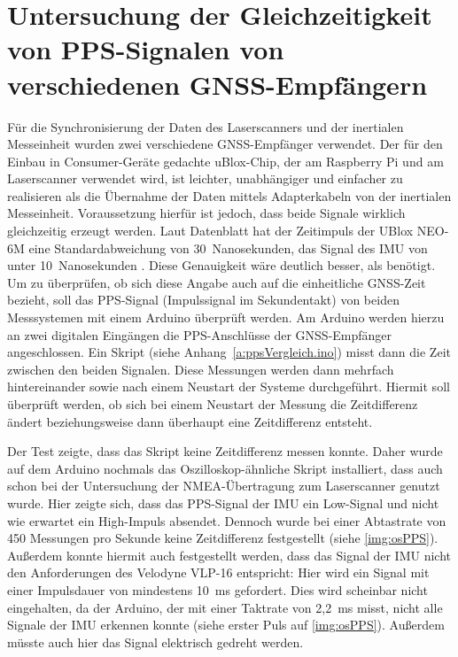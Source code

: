 \documentclass[a4paper,12pt,bibliography=totoc, listof=totoc,titlepage,pointlessnumbers]{scrreprt}
\begin{document}
\section{Untersuchung der Gleichzeitigkeit von PPS-Signalen von verschiedenen GNSS-Empfängern}
Für die Synchronisierung der Daten des Laser\-scan\-ners und der inertialen Messeinheit wurden zwei verschiedene GNSS-Empfänger verwendet. Der für den Einbau in Consumer-Geräte gedachte uBlox-Chip, der am Rasp\-berry Pi und am Laser\-scan\-ner verwendet wird, ist leichter, unabhängiger und einfacher zu realisieren als die Übernahme der Daten mittels Adapterkabeln von der inertialen Messeinheit. Voraussetzung hierfür ist jedoch, dass beide Signale wirklich gleichzeitig erzeugt werden. Laut Datenblatt \citep{ubloxneo} hat der Zeitimpuls der UBlox NEO-6M eine Standardabweichung von 30~Nanosekunden, das Signal des IMU von unter 10~Nanosekunden \citep{imar}. Diese Genauigkeit wäre deutlich besser, als benötigt. Um zu überprüfen, ob sich diese Angabe auch auf die einheitliche GNSS-Zeit bezieht, soll das PPS-Signal (Impulssignal im Sekundentakt) von beiden Messsystemen mit einem Arduino überprüft werden.
Am Arduino werden hierzu an zwei digitalen Eingängen die PPS-Anschlüsse der GNSS-Empfänger angeschlossen. Ein Skript (siehe Anhang~\ref{a:ppsVergleich.ino}) misst dann die Zeit zwischen den beiden Signalen. Diese Messungen werden dann mehrfach hintereinander sowie nach einem Neustart der Systeme durchgeführt. Hiermit soll überprüft werden, ob sich bei einem Neustart der Messung die Zeitdifferenz ändert beziehungsweise dann überhaupt eine Zeitdifferenz entsteht.

Der Test zeigte, dass das Skript keine Zeitdifferenz messen konnte. Daher wurde auf dem Arduino nochmals das Oszilloskop-ähnliche Skript installiert, dass auch schon bei der Untersuchung der NMEA-Übertragung zum Laserscanner genutzt wurde. Hier zeigte sich, dass das PPS-Signal der IMU ein Low-Signal und nicht wie erwartet ein High-Impuls absendet. Dennoch wurde bei einer Abtastrate von 450 Messungen pro Sekunde keine Zeitdifferenz festgestellt (siehe \autoref{img:osPPS}). Außerdem konnte hiermit auch festgestellt werden, dass das Signal der IMU nicht den Anforderungen des Velodyne VLP-16 entspricht: Hier wird ein Signal mit einer Impulsdauer von mindestens 10~ms gefordert. Dies wird scheinbar nicht eingehalten, da der Arduino, der mit einer Taktrate von 2,2~ms misst, nicht alle Signale der IMU erkennen konnte (siehe erster Puls auf \autoref{img:osPPS}). Außerdem müsste auch hier das Signal elektrisch gedreht werden.
\end{document}

